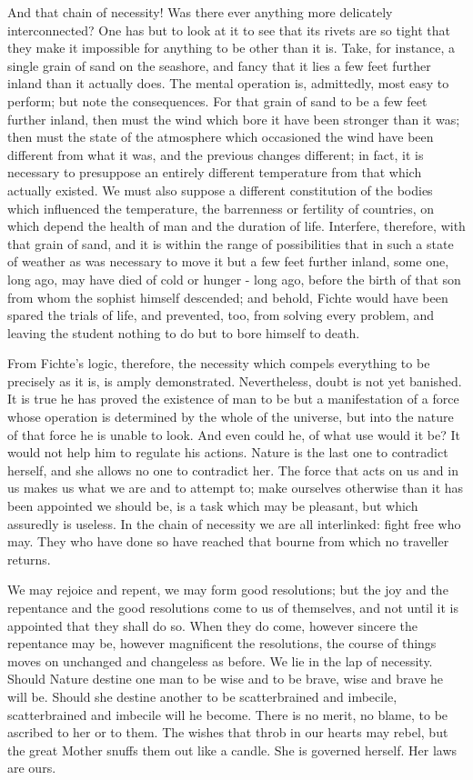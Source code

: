 \documentclass[]{book}
\begin{document}
And that chain of necessity! Was there ever anything more delicately
interconnected? One has but to look at it to see that its rivets are so
tight that they make it impossible for anything to be other than it is.
Take, for instance, a single grain of sand on the seashore, and fancy
that it lies a few feet further inland than it actually does. The mental
operation is, admittedly, most easy to perform; but note the
consequences. For that grain of sand to be a few feet further inland,
then must the wind which bore it have been stronger than it was; then
must the state of the atmosphere which occasioned the wind have been
different from what it was, and the previous changes different; in fact,
it is necessary to presuppose an entirely different temperature from
that which actually existed. We must also suppose a different
constitution of the bodies which influenced the temperature, the
barrenness or fertility of countries, on which depend the health of man
and the duration of life. Interfere, therefore, with that grain of sand,
and it is within the range of possibilities that in such a state of
weather as was necessary to move it but a few feet further inland, some
one, long ago, may have died of cold or hunger - long ago, before the
birth of that son from whom the sophist himself descended; and behold,
Fichte would have been spared the trials of life, and prevented, too,
from solving every problem, and leaving the student nothing to do but to
bore himself to death.

From Fichte's logic, therefore, the necessity which compels everything
to be precisely as it is, is amply demonstrated. Nevertheless, doubt is
not yet banished. It is true he has proved the existence of man to be
but a manifestation of a force whose operation is determined by the
whole of the universe, but into the nature of that force he is unable to
look. And even could he, of what use would it be? It would not help him
to regulate his actions. Nature is the last one to contradict herself,
and she allows no one to contradict her. The force that acts on us and
in us makes us what we are and to attempt to; make ourselves otherwise
than it has been appointed we should be, is a task which may be
pleasant, but which assuredly is useless. In the chain of necessity we
are all interlinked: fight free who may. They who have done so have
reached that bourne from which no traveller returns.

We may rejoice and repent, we may form good resolutions; but the joy and
the repentance and the good resolutions come to us of themselves, and
not until it is appointed that they shall do so. When they do come,
however sincere the repentance may be, however magnificent the
resolutions, the course of things moves on unchanged and changeless as
before. We lie in the lap of necessity. Should Nature destine one man to
be wise and to be brave, wise and brave he will be. Should she destine
another to be scatterbrained and imbecile, scatterbrained and imbecile
will he become. There is no merit, no blame, to be ascribed to her or to
them. The wishes that throb in our hearts may rebel, but the great
Mother snuffs them out like a candle. She is governed herself. Her laws
are ours.
\end{document}

